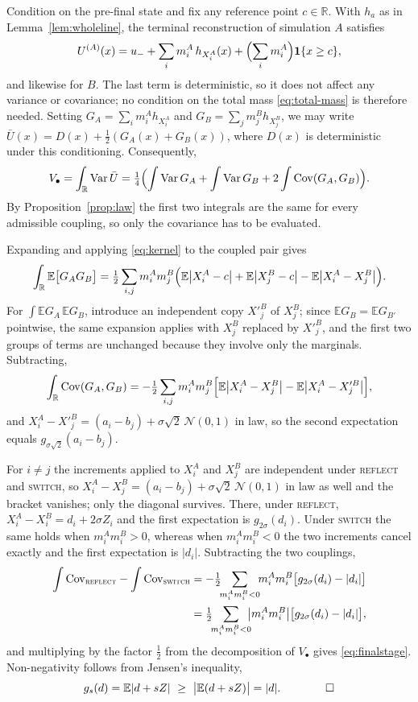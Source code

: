 \documentclass[smallextended,nospthms]{svjour3}
\theoremstyle{plain}
\theoremstyle{definition}
\theoremstyle{remark}
\numberwithin{equation}{section}
\newcommand{\E}{\mathbb{E}}
\newcommand{\Var}{\operatorname{Var}}
\newcommand{\R}{\mathbb{R}}
\newcommand{\ind}{\mathbf{1}}
\newcommand{\refl}{\textnormal{\textsc{reflect}}}
\newcommand{\swi}{\textnormal{\textsc{switch}}}
\begin{document}
Condition on the pre-final state and fix any reference point $c\in\R$. With
$h_a$ as in Lemma~\ref{lem:wholeline}, the terminal reconstruction of
simulation $A$ satisfies
\[
 U^{(A)}(x)=u_-+\sum_i m^A_i\,h_{X^A_i}(x)
  +\Bigl(\sum_i m^A_i\Bigr)\ind\{x\ge c\},
\]
and likewise for $B$. The last term is deterministic, so it does not affect any
variance or covariance; no condition on the total mass \eqref{eq:total-mass} is
therefore needed. Setting $G_A=\sum_i m^A_i h_{X^A_i}$ and
$G_B=\sum_j m^B_j h_{X^B_j}$, we may write
$\bar U(x)=D(x)+\tfrac12(G_A(x)+G_B(x))$, where $D(x)$ is deterministic under
this conditioning. Consequently,
\[
  V_\bullet=\int_\R\Var\bar U
  =\tfrac14\Bigl(\int\Var G_A+\int\Var G_B+2\int\mathrm{Cov}(G_A,G_B)\Bigr).
\]
By Proposition~\ref{prop:law} the first two integrals are the same for every
admissible coupling, so only the covariance has to be evaluated.

Expanding and applying \eqref{eq:kernel} to the coupled pair gives
\[
 \int_\R\E\bigl[G_AG_B\bigr]
 =\tfrac12\sum_{i,j}m^A_im^B_j
   \Bigl(\E\bigl|X^A_i-c\bigr|+\E\bigl|X^B_j-c\bigr|
         -\E\bigl|X^A_i-X^B_j\bigr|\Bigr).
\]
For $\int\E G_A\,\E G_B$, introduce an independent copy $X'^B_j$ of $X^B_j$;
since $\E G_B=\E G_{B'}$ pointwise, the same expansion applies with
$X^B_j$ replaced by $X'^B_j$, and the first two groups of terms are unchanged
because they involve only the marginals. Subtracting,
\[
  \int_\R\mathrm{Cov}(G_A,G_B)
  =-\tfrac12\sum_{i,j}m^A_im^B_j
     \Bigl[\E\bigl|X^A_i-X^B_j\bigr|-\E\bigl|X^A_i-X'^B_j\bigr|\Bigr],
\]
and $X^A_i-X'^B_j=(a_i-b_j)+\sigma\sqrt2\,\mathcal N(0,1)$ in law, so the
second expectation equals $g_{\sigma\sqrt2}(a_i-b_j)$.

For $i\ne j$ the increments applied to $X^A_i$ and $X^B_j$ are independent
under \refl{} and \swi{}, so
$X^A_i-X^B_j=(a_i-b_j)+\sigma\sqrt2\,\mathcal N(0,1)$ in law as well and the
bracket vanishes; only the diagonal survives. There, under \refl{},
$X^A_i-X^B_i=d_i+2\sigma Z_i$ and the first expectation is $g_{2\sigma}(d_i)$.
Under \swi{} the same holds when $m^A_im^B_i>0$, whereas when
$m^A_im^B_i<0$ the two increments cancel exactly and the first expectation is
$|d_i|$. Subtracting the two couplings,
\[
 \begin{aligned}
  \int\mathrm{Cov}_{\refl}-\int\mathrm{Cov}_{\swi}
  &=-\tfrac12\!\!\sum_{m^A_im^B_i<0}\!\! m^A_im^B_i
      \bigl[g_{2\sigma}(d_i)-|d_i|\bigr]\\
  &=\tfrac12\!\!\sum_{m^A_im^B_i<0}\!\!\bigl|m^A_im^B_i\bigr|
      \bigl[g_{2\sigma}(d_i)-|d_i|\bigr],
 \end{aligned}
\]
and multiplying by the factor $\tfrac12$ from the decomposition of $V_\bullet$
gives \eqref{eq:finalstage}. Non-negativity follows from Jensen's inequality,
\[
 g_s(d)=\E|d+sZ|\ \ge\ \bigl|\E(d+sZ)\bigr|=|d|. \qquad\qed
\]
\end{document}
